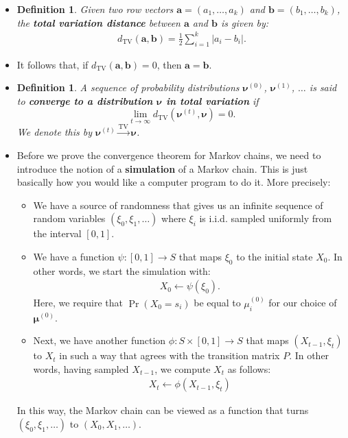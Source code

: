 \documentclass[10pt]{article}
\newtheorem{definition}[lemma]{Definition}
\newcommand{\ve}[1]{\mathbf{#1}}
\newcommand{\mrm}[1]{\mathrm{#1}}
\newcommand{\ves}[1]{\boldsymbol{#1}}
\begin{document}
\begin{itemize}
  \item \begin{definition}
    Given two row vectors $\ve{a} = (a_1, \dotsc, a_k)$ and $\ve{b} = (b_1, \dotsc, b_k)$, the {\bf total variation distance} between $\ve{a}$ and $\ve{b}$ is given by:
    \begin{align*}
        d_{\mrm{TV}}(\ve{a},\ve{b}) = \frac{1}{2} \sum_{i=1}^k | a_i - b_i |.
    \end{align*}
  \end{definition}

  \item It follows that, if $d_{\mrm{TV}}(\ve{a}, \ve{b}) = 0$, then $\ve{a} = \ve{b}$.
  
  \item \begin{definition}
    A sequence of probability distributions $\ves{\nu}^{(0)}$, $\ves{\nu}^{(1)}$, $\dotsc$ is said to {\bf converge to a distribution $\ves{\nu}$ in total variation} if $$\lim_{t \rightarrow \infty} d_{\mrm{TV}}(\ves{\nu}^{(t)}, \ves{\nu}) = 0.$$ We denote this by $\ves{\nu}^{(t)} \xrightarrow{\mrm{TV}} \ves{\nu}$.
  \end{definition}

  \item Before we prove the convergence theorem for Markov chains, we need to introduce the notion of a {\bf simulation} of a Markov chain. This is just basically how you would like a computer program to do it. More precisely:
  \begin{itemize}
    \item We have a source of randomness that gives us an infinite sequence of random variables $(\xi_0, \xi_1, \dotsc)$ where $\xi_i$ is i.i.d. sampled uniformly from the interval $[0,1]$.
    
    \item We have a function $\psi: [0,1] \rightarrow S$ that maps $\xi_0$ to the initial state $X_0$. In other words, we start the simulation with:
    \begin{align*}
        X_0 \gets \psi(\xi_0).
    \end{align*}
    Here, we require that $\Pr(X_0 = s_i)$ be equal to $\mu_i^{(0)}$ for our choice of $\ves{\mu}^{(0)}$.

    \item Next, we have another function $\phi: S \times [0,1] \rightarrow S$ that maps $(X_{t-1}, \xi_t)$ to $X_t$ in such a way that agrees with the transition matrix $P$. In other words, having sampled $X_{t-1}$, we compute $X_t$ as follows:
    \begin{align*}
        X_{t} \gets \phi(X_{t-1}, \xi_t)
    \end{align*}
  \end{itemize}
  In this way, the Markov chain can be viewed as a function that turns $(\xi_0, \xi_1, \dotsc)$ to $(X_0, X_1, \dotsc)$.


\end{itemize}
\end{document}
